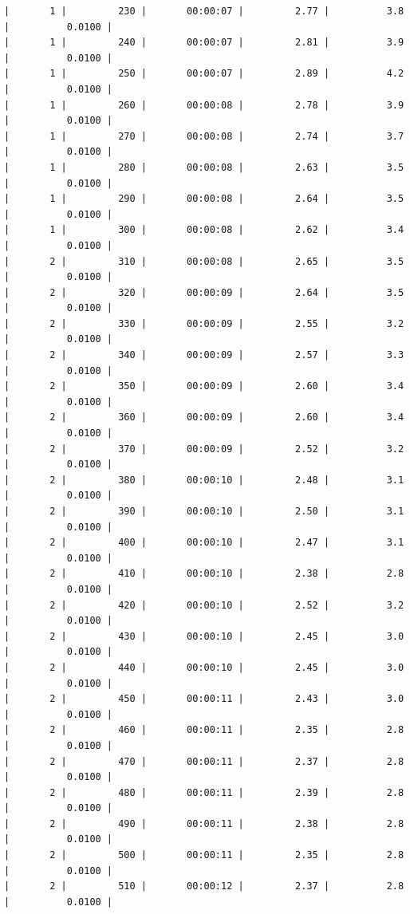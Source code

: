 \documentclass[11pt]{article}
\begin{document}
\begin{Verbatim}[commandchars=\\\{\}]
|       1 |         230 |       00:00:07 |         2.77 |          3.8 |          0.0100 |
|       1 |         240 |       00:00:07 |         2.81 |          3.9 |          0.0100 |
|       1 |         250 |       00:00:07 |         2.89 |          4.2 |          0.0100 |
|       1 |         260 |       00:00:08 |         2.78 |          3.9 |          0.0100 |
|       1 |         270 |       00:00:08 |         2.74 |          3.7 |          0.0100 |
|       1 |         280 |       00:00:08 |         2.63 |          3.5 |          0.0100 |
|       1 |         290 |       00:00:08 |         2.64 |          3.5 |          0.0100 |
|       1 |         300 |       00:00:08 |         2.62 |          3.4 |          0.0100 |
|       2 |         310 |       00:00:08 |         2.65 |          3.5 |          0.0100 |
|       2 |         320 |       00:00:09 |         2.64 |          3.5 |          0.0100 |
|       2 |         330 |       00:00:09 |         2.55 |          3.2 |          0.0100 |
|       2 |         340 |       00:00:09 |         2.57 |          3.3 |          0.0100 |
|       2 |         350 |       00:00:09 |         2.60 |          3.4 |          0.0100 |
|       2 |         360 |       00:00:09 |         2.60 |          3.4 |          0.0100 |
|       2 |         370 |       00:00:09 |         2.52 |          3.2 |          0.0100 |
|       2 |         380 |       00:00:10 |         2.48 |          3.1 |          0.0100 |
|       2 |         390 |       00:00:10 |         2.50 |          3.1 |          0.0100 |
|       2 |         400 |       00:00:10 |         2.47 |          3.1 |          0.0100 |
|       2 |         410 |       00:00:10 |         2.38 |          2.8 |          0.0100 |
|       2 |         420 |       00:00:10 |         2.52 |          3.2 |          0.0100 |
|       2 |         430 |       00:00:10 |         2.45 |          3.0 |          0.0100 |
|       2 |         440 |       00:00:10 |         2.45 |          3.0 |          0.0100 |
|       2 |         450 |       00:00:11 |         2.43 |          3.0 |          0.0100 |
|       2 |         460 |       00:00:11 |         2.35 |          2.8 |          0.0100 |
|       2 |         470 |       00:00:11 |         2.37 |          2.8 |          0.0100 |
|       2 |         480 |       00:00:11 |         2.39 |          2.8 |          0.0100 |
|       2 |         490 |       00:00:11 |         2.38 |          2.8 |          0.0100 |
|       2 |         500 |       00:00:11 |         2.35 |          2.8 |          0.0100 |
|       2 |         510 |       00:00:12 |         2.37 |          2.8 |          0.0100 |

\end{Verbatim}
\end{document}
